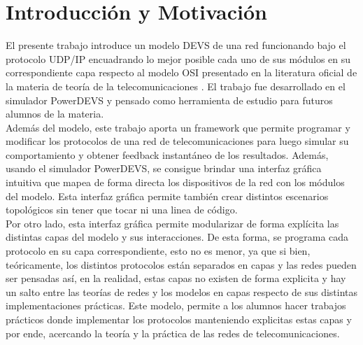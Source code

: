 \documentclass[10pt,a4paper]{article}
\begin{document}

\fecha{\today}



\maketitle

\tableofcontents
\newpage

\section{Introducción y Motivación}

El presente trabajo introduce un modelo DEVS de una red funcionando bajo el protocolo UDP/IP encuadrando lo mejor posible cada uno de sus módulos en su correspondiente capa respecto al modelo OSI presentado en la literatura oficial de la materia de teoría de la telecomunicaciones \cite{peterson2011computer}. El trabajo fue desarrollado en el simulador PowerDEVS y pensado como herramienta de estudio para futuros alumnos de la materia. \\

Además del modelo, este trabajo aporta un framework que permite programar y modificar los protocolos de una red de telecomunicaciones para luego simular su comportamiento y obtener feedback instantáneo de los resultados. Además, usando el simulador PowerDEVS, se consigue brindar una interfaz gráfica intuitiva que mapea de forma directa los dispositivos de la red con los módulos del modelo. Esta interfaz gráfica permite también crear distintos escenarios topológicos sin tener que tocar ni una linea de código. \\

Por otro lado, esta interfaz gráfica permite modularizar de forma explícita las distintas capas del modelo y sus interacciones. De esta forma, se programa cada protocolo en su capa correspondiente, esto no es menor, ya que si bien, teóricamente, los distintos protocolos están separados en capas y las redes pueden ser pensadas así, en la realidad, estas capas no existen de forma explicita y hay un salto entre las teorías de redes y los modelos en capas respecto de sus distintas implementaciones prácticas. Este modelo, permite a los alumnos hacer trabajos prácticos donde implementar los protocolos manteniendo explicitas estas capas y por ende, acercando la teoría y la práctica de las redes de telecomunicaciones. \\
\end{document}
